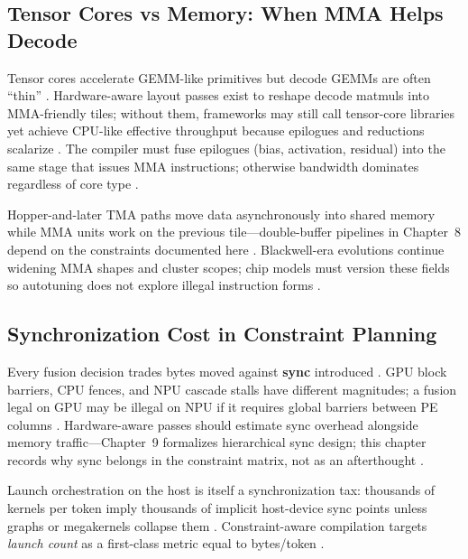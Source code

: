 \subsection{Tensor Cores vs Memory: When MMA Helps Decode}
\label{sec:ch03_tensor_core_decode}

Tensor cores accelerate GEMM-like primitives but decode GEMMs are often ``thin'' \citep{patel2025llminference,memoryfloor2026}.
Hardware-aware layout passes exist to reshape decode matmuls into MMA-friendly tiles; without them, frameworks may still call tensor-core libraries yet achieve CPU-like effective throughput because epilogues and reductions scalarize \citep{semianalysis2024tma,nvidia2022hopper}.
The compiler must fuse epilogues (bias, activation, residual) into the same stage that issues MMA instructions; otherwise bandwidth dominates regardless of core type \citep{memoryfloor2026,patel2025llminference}.

Hopper-and-later TMA paths move data asynchronously into shared memory while MMA units work on the previous tile---double-buffer pipelines in Chapter~8 depend on the constraints documented here \citep{semianalysis2024tma,nvidia2022hopper}.
Blackwell-era evolutions continue widening MMA shapes and cluster scopes; chip models must version these fields so autotuning does not explore illegal instruction forms \citep{semianalysis2024tma}.

\subsection{Synchronization Cost in Constraint Planning}
\label{sec:ch03_sync_preview}

Every fusion decision trades bytes moved against \textbf{sync} introduced \citep{patel2025llminference,taxbreak2026}.
GPU block barriers, CPU fences, and NPU cascade stalls have different magnitudes; a fusion legal on GPU may be illegal on NPU if it requires global barriers between PE columns \citep{amd2024xdna,nvidia2022hopper}.
Hardware-aware passes should estimate sync overhead alongside memory traffic---Chapter~9 formalizes hierarchical sync design; this chapter records why sync belongs in the constraint matrix, not as an afterthought \citep{patel2025llminference}.

Launch orchestration on the host is itself a synchronization tax: thousands of kernels per token imply thousands of implicit host-device sync points unless graphs or megakernels collapse them \citep{taxbreak2026,nvidia2024cudagraphs}.
Constraint-aware compilation targets \emph{launch count} as a first-class metric equal to bytes/token \citep{taxbreak2026,memoryfloor2026}.

